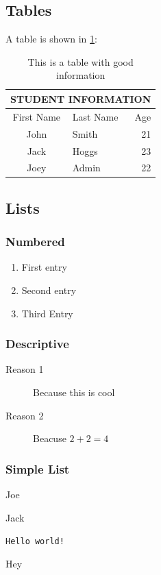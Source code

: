 \subsection{Tables}

A table is shown in \cref{tab:table-info}:

\begin{table}[h]
  \centering
  \begin{tabular}{cl|r}
    \multicolumn{3}{c}{\textbf{STUDENT INFORMATION}} \\
    \toprule
    First Name  & Last Name & Age \\
    \midrule
    John & Smith & 21\\
    Jack & Hoggs & 23\\
    Joey & Admin & 22\\
    \bottomrule
  \end{tabular}
  \caption{This is a table with good information}
  \label{tab:table-info}
\end{table}


\subsection{Lists}
\subsubsection{Numbered}
\begin{enumerate}
  \item First entry
  \item Second entry
  \item Third Entry
\end{enumerate}

\subsubsection{Descriptive}
\begin{description}
  \item[Reason 1]Because this is cool
  \item[Reason 2]Beacuse $2+2=4$
\end{description}

\subsubsection{Simple List}
\begin{list}{+}{}
\item Joe
\item Jack
\item \verb#Hello world!#
\item Hey
\end{list}

